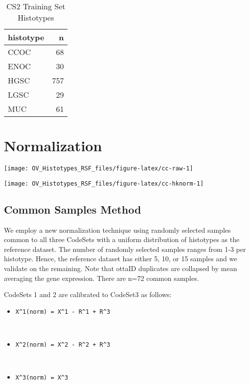 \documentclass[
]{report}
\providecommand{\tightlist}{%
  \setlength{\itemsep}{0pt}\setlength{\parskip}{0pt}}
\begin{document}
\begin{table}

\caption{\label{tab:training-dist-cs2}CS2 Training Set Histotypes}
\centering
\begin{tabular}[t]{l|r}
\hline
histotype & n\\
\hline
CCOC & 68\\
\hline
ENOC & 30\\
\hline
HGSC & 757\\
\hline
LGSC & 29\\
\hline
MUC & 61\\
\hline
\end{tabular}
\end{table}

\hypertarget{normalization}{%
\section{Normalization}\label{normalization}}

\begin{center}\texttt{[image: OV\_Histotypes\_RSF\_files/figure-latex/cc-raw-1]} \end{center}

\begin{center}\texttt{[image: OV\_Histotypes\_RSF\_files/figure-latex/cc-hknorm-1]} \end{center}

\hypertarget{common-samples-method-1}{%
\subsection{Common Samples Method}\label{common-samples-method-1}}

We employ a new normalization technique using randomly selected samples common to all three CodeSets with a uniform distribution of histotypes as the reference dataset. The number of randomly selected samples ranges from 1-3 per histotype. Hence, the reference dataset has either 5, 10, or 15 samples and we validate on the remaining. Note that ottaID duplicates are collapsed by mean averaging the gene expression. There are n=72 common samples.

CodeSets 1 and 2 are calibrated to CodeSet3 as follows:

\begin{itemize}
\tightlist
\item
  \texttt{X\^{}1(norm)\ =\ X\^{}1\ -\ R\^{}1\ +\ R\^{}3}\strut \\
\item
  \texttt{X\^{}2(norm)\ =\ X\^{}2\ -\ R\^{}2\ +\ R\^{}3}\strut \\
\item
  \texttt{X\^{}3(norm)\ =\ X\^{}3}
\end{itemize}
\end{document}
